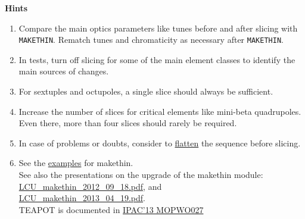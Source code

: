 {\bf Hints}
\begin{enumerate}
\item Compare the main optics parameters like tunes before and after slicing
  with {\tt MAKETHIN}. Rematch tunes and chromaticity as necessary after
  {\tt MAKETHIN}. 

\item In tests, turn off slicing for some of the main element classes to
  identify the main sources of changes. 

\item For sextuples and octupoles, a single slice should always be sufficient.

\item Increase the number of slices for critical elements like mini-beta
  quadrupoles. Even there, more than four slices should rarely be
  required. 

\item In case of problems or doubts, consider to
  \href{http://madx.web.cern.ch/madx/madX/doc/usrguide/control/seqedit.html#flatten}{flatten}
  the sequence before slicing.  

\item See the
  \href{http://madx.web.cern.ch/madx/madX/examples/makethin/}{examples}
  for makethin. \\ 
  See also the presentations on the upgrade of the makethin module:\\
  \href{http://ab-dep-abp.web.cern.ch/ab-dep-abp/LCU/LCU_meetings/2012/20120918/LCU_makethin_2012_09_18.pdf}{LCU\_makethin\_2012\_09\_18.pdf}, and \\
  \href{http://ab-dep-abp.web.cern.ch/ab-dep-abp/LCU/LCU_meetings/2013/20130419/LCU_makethin_2013_04_19.pdf}{LCU\_makethin\_2013\_04\_19.pdf}. \\ 
  TEAPOT is documented in \href{http://accelconf.web.cern.ch/AccelConf/IPAC2013/papers/mopwo027.pdf}{IPAC'13 MOPWO027}

\end{enumerate}














